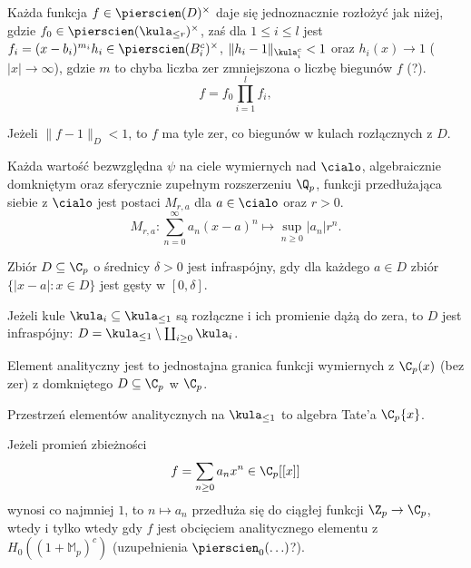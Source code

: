 \begin{fakt}
	Każda funkcja $f \in \pierscien(D)^\times$ daje się jednoznacznie rozłożyć jak niżej, gdzie $f_0 \in \pierscien(\kula_{\le r})^\times$, zaś dla $1 \le i \le l$ jest $f_i = (x-b_i)^{m_i} h_i \in \pierscien(B_i^c)^\times$, $\|h_i - 1\|_{\kula_i^c} < 1$ oraz $h_i(x) \to 1$ ($|x| \to \infty$), gdzie $m$ to chyba liczba zer zmniejszona o liczbę biegunów $f$ (?).
	\[
		f = f_0 \prod_{i=1}^l f_i,
	\]
\end{fakt}

\begin{fakt}
	Jeżeli $\|f - 1\|_D < 1$, to $f$ ma tyle zer, co biegunów w kulach rozłącznych z $D$.
\end{fakt}

\begin{fakt}
	Każda wartość bezwzględna $\psi$ na ciele wymiernych nad $\cialo$, algebraicznie domkniętym oraz sferycznie zupełnym rozszerzeniu $\Q_p$, funkcji przedłużająca siebie z $\cialo$ jest postaci $M_{r,a}$ dla $a \in \cialo$ oraz $r > 0$.
	\[
		M_{r,a} \colon \sum_{n=0}^\infty a_n (x-a)^n \mapsto \sup_{n \ge 0} |a_n| r^n.
	\]
\end{fakt}

\begin{definicja}
	Zbiór $D \subseteq \C_p$ o średnicy $\delta > 0$ jest infraspójny, gdy dla każdego $a \in D$ zbiór $\{|x-a| : x \in D\}$ jest gęsty w $[0, \delta]$.
\end{definicja}

\begin{fakt}
	Jeżeli kule $\kula_i \subseteq \kula_{\le 1}$ są rozłączne i ich promienie dążą do zera, to $D$ jest infraspójny: $D = \kula_{\le 1} \setminus \coprod_{i \ge 0} \kula_i$.
\end{fakt}

\begin{definicja}
	Element analityczny jest to jednostajna granica funkcji wymiernych z $\C_p(x)$ (bez zer) z domkniętego $D \subseteq \C_p$ w $\C_p$.
\end{definicja}

\begin{fakt}
	Przestrzeń elementów analitycznych na $\kula_{\le 1}$ to algebra Tate'a $\C_p\{x\}$.
\end{fakt}

\begin{twierdzenie}
	Jeżeli promień zbieżności 
	\[
		f = \sum_{n \ge 0} a_n x^n \in \C_p[[x]]
	\]
	wynosi co najmniej $1$, to $n \mapsto a_n$ przedłuża się do ciągłej funkcji $\Z_p \to \C_p$, wtedy i tylko wtedy gdy $f$ jest obcięciem analitycznego elementu z $H_0((1+ \mathbb M_p)^c)$ (uzupełnienia $\pierscien_0(\ldots)$?).
\end{twierdzenie}

